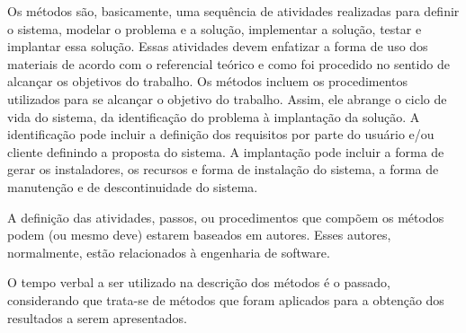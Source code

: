 Os métodos são, basicamente, uma sequência de atividades realizadas para definir o sistema, modelar o problema e a solução, implementar a solução, testar e implantar essa solução. Essas atividades devem enfatizar a forma de uso dos materiais de acordo com o referencial teórico e como foi procedido no sentido de alcançar os objetivos do trabalho.
Os métodos incluem os procedimentos utilizados para se alcançar o objetivo do trabalho. Assim, ele abrange o ciclo de vida do sistema, da identificação do problema à implantação da solução. A identificação pode incluir a definição dos requisitos por parte do usuário e/ou cliente definindo a proposta do sistema. A implantação pode incluir a forma de gerar os instaladores, os recursos e forma de instalação do sistema, a forma de manutenção e de descontinuidade do sistema.

A definição das atividades, passos, ou procedimentos que compõem os métodos podem (ou mesmo deve) estarem baseados em autores. Esses autores, normalmente, estão relacionados à engenharia de software.

O tempo verbal a ser utilizado na descrição dos métodos é o passado, considerando que trata-se de métodos que foram aplicados para a obtenção dos resultados a serem apresentados.
